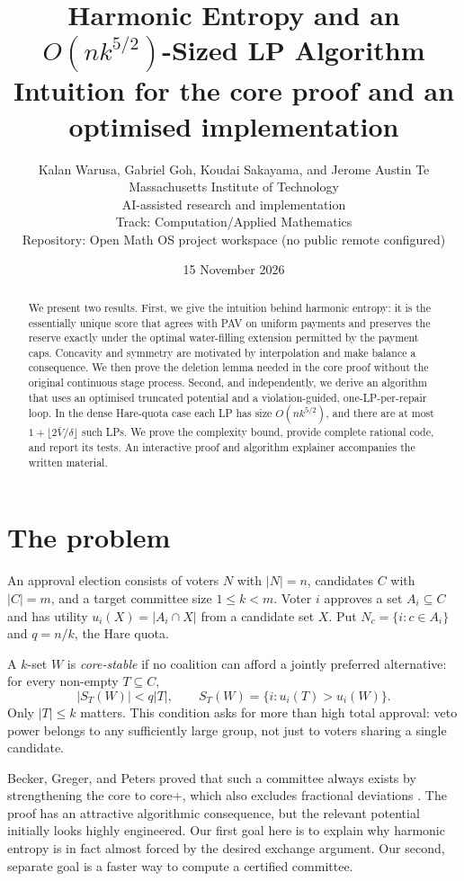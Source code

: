 \documentclass[11pt,a4paper]{article}
\title{\LARGE Harmonic Entropy and an \texorpdfstring{$O(nk^{5/2})$}{O(nk^5/2)}-Sized LP Algorithm\\[8pt]
\large Intuition for the core proof and an optimised implementation}
\author{Kalan Warusa, Gabriel Goh, Koudai Sakayama, and Jerome Austin Te\\
Massachusetts Institute of Technology\\[4pt]
AI-assisted research and implementation\\[4pt]
Track: Computation/Applied Mathematics\\
Repository: Open Math OS project workspace (no public remote configured)}
\date{15 November 2026}
\theoremstyle{definition}
\theoremstyle{remark}
\begin{document}
\maketitle
\begin{abstract}
We present two results. First, we give the intuition behind harmonic entropy: it is the essentially unique score that agrees with PAV on uniform payments and preserves the reserve exactly under the optimal water-filling extension permitted by the payment caps. Concavity and symmetry are motivated by interpolation and make balance a consequence. We then prove the deletion lemma needed in the core proof without the original continuous stage process. Second, and independently, we derive an algorithm that uses an optimised truncated potential and a violation-guided, one-LP-per-repair loop. In the dense Hare-quota case each LP has size $O(nk^{5/2})$, and there are at most $1+\lfloor2\bar V/\delta\rfloor$ such LPs. We prove the complexity bound, provide complete rational code, and report its tests. An interactive proof and algorithm explainer accompanies the written material.
\end{abstract}
\tableofcontents

\section{The problem}
An approval election consists of voters $N$ with $|N|=n$, candidates $C$ with $|C|=m$, and a target committee size $1\le k<m$. Voter $i$ approves a set $A_i\subseteq C$ and has utility $u_i(X)=|A_i\cap X|$ from a candidate set $X$. Put $N_c=\{i:c\in A_i\}$ and $q=n/k$, the Hare quota.

A $k$-set $W$ is \emph{core-stable} if no coalition can afford a jointly preferred alternative: for every non-empty $T\subseteq C$,
\[
|S_T(W)|<q|T|,\qquad S_T(W)=\{i:u_i(T)>u_i(W)\}.
\]
Only $|T|\le k$ matters. This condition asks for more than high total approval: veto power belongs to any sufficiently large group, not just to voters sharing a single candidate.

Becker, Greger, and Peters proved that such a committee always exists by strengthening the core to core+, which also excludes fractional deviations \cite{bgp}. The proof has an attractive algorithmic consequence, but the relevant potential initially looks highly engineered. Our first goal here is to explain why harmonic entropy is in fact almost forced by the desired exchange argument. Our second, separate goal is a faster way to compute a certified committee.
\end{document}
